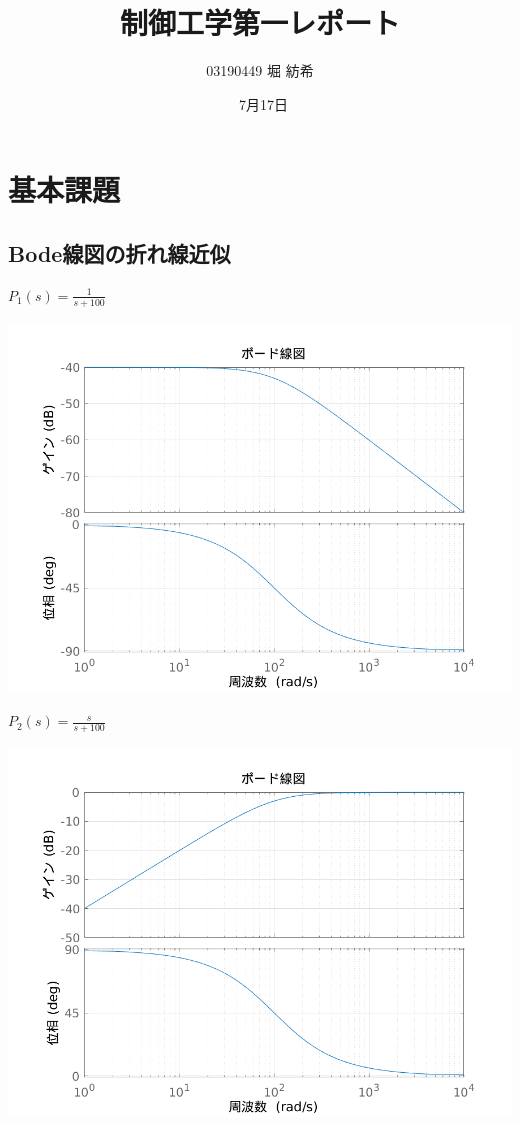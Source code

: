 \documentclass[dvipdfmx, twocolumn]{jsarticle}
\begin{document}
\title{制御工学第一レポート}
\author{03190449  堀 紡希}
\date{\ 7月17日}
\maketitle

\section{基本課題}

\subsection{Bode線図の折れ線近似}

$P_{1}(s)=\frac{1}{s+100}$

\includegraphics[scale = 0.5]{bode1.png}

$P_{2}(s)=\frac{s}{s+100}$

\includegraphics[scale = 0.5]{bode2.png}
\end{document}
